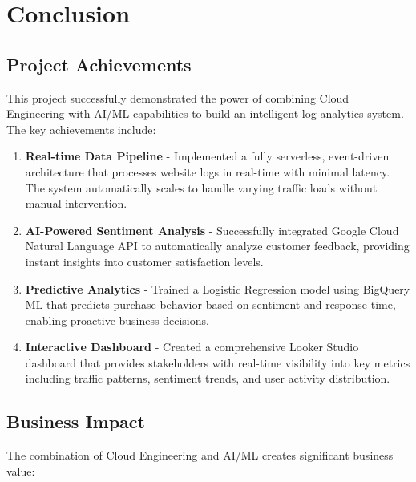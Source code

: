 \documentclass[12pt,a4paper]{article}
\begin{document}
\section{Conclusion}

\subsection{Project Achievements}

This project successfully demonstrated the power of combining Cloud Engineering with AI/ML capabilities to build an intelligent log analytics system. The key achievements include:

\begin{enumerate}
    \item \textbf{Real-time Data Pipeline} - Implemented a fully serverless, event-driven architecture that processes website logs in real-time with minimal latency. The system automatically scales to handle varying traffic loads without manual intervention.
    
    \item \textbf{AI-Powered Sentiment Analysis} - Successfully integrated Google Cloud Natural Language API to automatically analyze customer feedback, providing instant insights into customer satisfaction levels.
    
    \item \textbf{Predictive Analytics} - Trained a Logistic Regression model using BigQuery ML that predicts purchase behavior based on sentiment and response time, enabling proactive business decisions.
    
    \item \textbf{Interactive Dashboard} - Created a comprehensive Looker Studio dashboard that provides stakeholders with real-time visibility into key metrics including traffic patterns, sentiment trends, and user activity distribution.
\end{enumerate}

\subsection{Business Impact}

The combination of Cloud Engineering and AI/ML creates significant business value:
\end{document}
